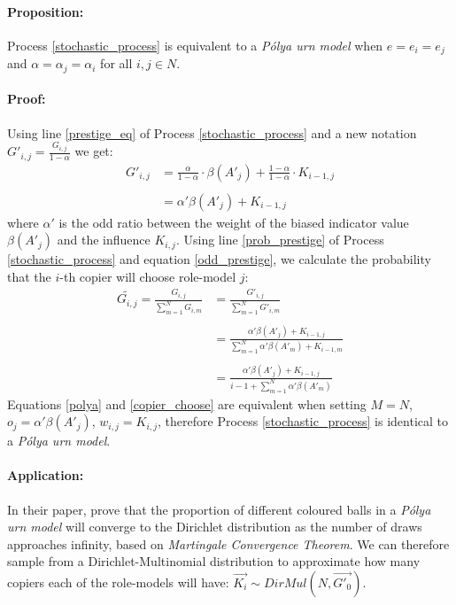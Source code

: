 \documentclass[11pt]{article}
\begin{document}
\paragraph{Proposition:} Process \ref{stochastic_process} is equivalent to a \textit{Pólya urn model} when $e=e_i=e_j$ and $\alpha=\alpha_j=\alpha_i$ for all $i,j \in N$.
\paragraph{Proof:} 
Using line \ref{prestige_eq} of Process \ref{stochastic_process} and a new notation $G'_{i,j} = \frac{G_{i,j}}{1-\alpha}$ we get:
\begin{equation}\label{odd_prestige}
\begin{split}
G'_{i,j} & = \frac{\alpha}{1-\alpha}\cdot \beta(A'_j) + \frac{1-\alpha}{1-\alpha}\cdot K_{i-1,j}\\\\
& = \alpha'\beta(A'_j) + K_{i-1,j}
\end{split}
\end{equation}
where $\alpha'$ is the odd ratio between the weight of the biased indicator value $\beta(A'_j)$ and the influence $K_{i,j}$.
Using line \ref{prob_prestige} of Process \ref{stochastic_process} and equation \ref{odd_prestige}, we calculate the probability that the $i$-th copier will choose role-model $j$:
\begin{equation}\label{copier_choose}
\begin{split}
\widetilde{G_{i,j}} = \frac{G_{i,j}}{\sum\limits_{m=1}^{N} G_{i,m}} &= \frac{G'_{i,j}}{\sum\limits_{m=1}^{N} G'_{i,m}}\\\\
&= \frac{\alpha'\beta(A'_j) + K_{i-1,j}}{\sum\limits_{m=1}^{N} \alpha'\beta(A'_m) + K_{i-1,m}}\\\\
& =\frac{\alpha'\beta(A'_j) + K_{i-1,j}}{i-1 + \sum\limits_{m=1}^{N} \alpha'\beta(A'_m)}
\end{split}
\end{equation}
Equations \ref{polya} and \ref{copier_choose} are equivalent when setting $M=N$, $o_j = \alpha'\beta(A'_j)$, $w_{i,j} = K_{i,j}$, therefore Process \ref{stochastic_process} is identical to a \textit{Pólya urn model}.

\paragraph{Application:}
In their paper, \citet[section 2]{dirichlet} prove that the proportion of different coloured balls in a \textit{Pólya urn model} will converge to the Dirichlet distribution as the number of draws approaches infinity, based on \textit{Martingale Convergence Theorem}.
We can therefore sample from a Dirichlet-Multinomial distribution to approximate how many copiers each of the role-models will have:
$\overrightarrow{K_i} \sim DirMul(N,\overrightarrow{G'_0})$.
\end{document}
